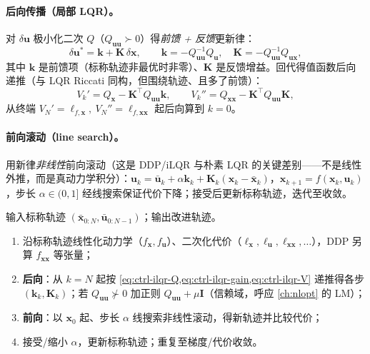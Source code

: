 \paragraph{后向传播（局部 LQR）。}
对 $\delta\mathbf{u}$ 极小化二次 $Q$（$Q_{\mathbf{u}\mathbf{u}}\succ0$）得\emph{前馈 + 反馈}更新律\cite{tedrake_underactuated}：
\begin{equation}
  \delta\mathbf{u}^*=\mathbf{k}+\mathbf{K}\,\delta\mathbf{x},\qquad
  \mathbf{k}=-Q_{\mathbf{u}\mathbf{u}}^{-1}Q_{\mathbf{u}},\quad \mathbf{K}=-Q_{\mathbf{u}\mathbf{u}}^{-1}Q_{\mathbf{u}\mathbf{x}},
  \label{eq:ctrl-ilqr-gain}
\end{equation}
其中 $\mathbf{k}$ 是前馈项（标称轨迹非最优时非零）、$\mathbf{K}$ 是反馈增益。回代得值函数后向递推（与 LQR Riccati 同构，但围绕轨迹、且多了前馈）：
\begin{equation}
  V_k'=Q_{\mathbf{x}}-\mathbf{K}^\top Q_{\mathbf{u}\mathbf{u}}\mathbf{k},\qquad
  V_k''=Q_{\mathbf{x}\mathbf{x}}-\mathbf{K}^\top Q_{\mathbf{u}\mathbf{u}}\mathbf{K},
  \label{eq:ctrl-ilqr-V}
\end{equation}
从终端 $V_N'=\ell_{f,\mathbf{x}},\ V_N''=\ell_{f,\mathbf{x}\mathbf{x}}$ 起后向算到 $k=0$。

\paragraph{前向滚动（line search）。}
用新律\emph{非线性}前向滚动（这是 DDP/iLQR 与朴素 LQR 的关键差别——不是线性外推，而是真动力学积分）：$\mathbf{u}_k=\bar{\mathbf{u}}_k+\alpha\mathbf{k}_k+\mathbf{K}_k(\mathbf{x}_k-\bar{\mathbf{x}}_k)$，$\mathbf{x}_{k+1}=f(\mathbf{x}_k,\mathbf{u}_k)$，步长 $\alpha\in(0,1]$ 经线搜索保证代价下降；接受后更新标称轨迹，迭代至收敛。

\begin{algo}
\label{alg:ctrl-ilqr}
输入标称轨迹 $(\bar{\mathbf{x}}_{0:N},\bar{\mathbf{u}}_{0:N-1})$；输出改进轨迹。
\begin{enumerate}
  \item 沿标称轨迹线性化动力学（$f_{\mathbf{x}},f_{\mathbf{u}}$）、二次化代价（$\ell_{\mathbf{x}},\ell_{\mathbf{u}},\ell_{\mathbf{x}\mathbf{x}},\dots$），DDP 另算 $f_{\mathbf{x}\mathbf{x}}$ 等张量；
  \item \textbf{后向}：从 $k=N$ 起按 \cref{eq:ctrl-ilqr-Q,eq:ctrl-ilqr-gain,eq:ctrl-ilqr-V} 递推得各步 $(\mathbf{k}_k,\mathbf{K}_k)$；若 $Q_{\mathbf{u}\mathbf{u}}\not\succ0$ 加正则 $Q_{\mathbf{u}\mathbf{u}}+\mu\mathbf{I}$（信赖域，呼应 \cref{ch:nlopt} 的 LM）；
  \item \textbf{前向}：以 $\mathbf{x}_0$ 起、步长 $\alpha$ 线搜索非线性滚动，得新轨迹并比较代价；
  \item 接受/缩小 $\alpha$，更新标称轨迹；重复至梯度/代价收敛。
\end{enumerate}
\end{algo}

